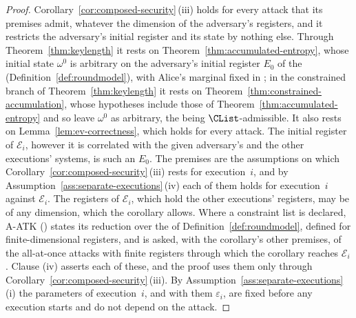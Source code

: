 \begin{proof}
Corollary~\ref{cor:composed-security}\,(iii) holds for every attack that
its premises admit, whatever the dimension of the adversary's registers, and
it restricts the adversary's initial register and its state by nothing
else. Through Theorem~\ref{thm:keylength} it rests on
Theorem~\ref{thm:accumulated-entropy}, whose initial state $\omega^0$ is
arbitrary on the adversary's initial register $E_0$ of the
 (Definition~\ref{def:roundmodel}), with Alice's marginal
fixed in ; in the constrained branch of
Theorem~\ref{thm:keylength} it rests on
Theorem~\ref{thm:constrained-accumulation}, whose hypotheses include those
of Theorem~\ref{thm:accumulated-entropy} and so leave $\omega^0$ as
arbitrary, the  being $\CList$-admissible. It also
rests on Lemma~\ref{lem:ev-correctness}, which holds for every attack. The
initial register of $\mathcal E_i$, however it
is correlated with the given adversary's and the other executions'
systems, is such an $E_0$. The premises are the assumptions on which
Corollary~\ref{cor:composed-security}\,(iii) rests for execution~$i$, and
by Assumption~\ref{ass:separate-executions}\,(iv) each of them holds for
execution~$i$ against $\mathcal E_i$. The registers of $\mathcal E_i$,
which hold the other executions' registers, may be of any dimension, which
the corollary allows. Where a constraint list is declared, A-ATK
() states its reduction over the
 of
Definition~\ref{def:roundmodel}, defined for finite-dimensional registers,
and is asked, with the corollary's other premises, of the all-at-once attacks
with finite registers through which the corollary reaches $\mathcal E_i$.
Clause (iv) asserts each of these, and the proof uses them only through
Corollary~\ref{cor:composed-security}\,(iii). By
Assumption~\ref{ass:separate-executions}\,(i) the parameters of
execution~$i$, and with them $\varepsilon_i$, are fixed before any
execution starts and do not depend on the attack.


\end{proof}
